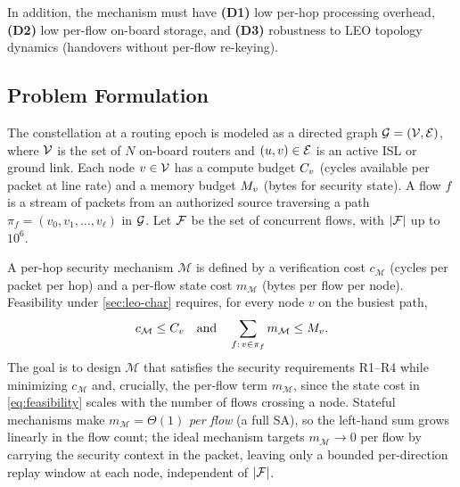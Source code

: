 In addition, the mechanism must have \textbf{(D1)} low per-hop processing
overhead, \textbf{(D2)} low per-flow on-board storage, and \textbf{(D3)}
robustness to LEO topology dynamics (handovers without per-flow re-keying).

\subsection{Problem Formulation}
\label{sec:formulation}

The constellation at a routing epoch is modeled as a directed graph
$\mathcal{G}=(\mathcal{V},\mathcal{E})$, where $\mathcal{V}$ is the set of $N$ on-board routers and
$(u,v)\in\mathcal{E}$ is an active ISL or ground link. Each node $v\in\mathcal{V}$ has a
compute budget $C_v$ (cycles available per packet at line rate) and a memory
budget $M_v$ (bytes for security state). A flow $f$ is a stream of packets from
an authorized source traversing a path $\pi_f=(v_0,v_1,\dots,v_\ell)$ in
$\mathcal{G}$. Let $\mathcal{F}$ be the set of concurrent flows, with $|\mathcal{F}|$ up to
$10^6$.

A per-hop security mechanism $\mathcal{M}$ is defined by a verification cost
$c_{\mathcal{M}}$ (cycles per packet per hop) and a per-flow state cost
$m_{\mathcal{M}}$ (bytes per flow per node). Feasibility under
\cref{sec:leo-char} requires, for every node $v$ on the busiest path,
\begin{equation}
\label{eq:feasibility}
c_{\mathcal{M}} \le C_v
\quad\text{and}\quad
\sum_{f:\,v\in\pi_f} m_{\mathcal{M}} \le M_v .
\end{equation}
The goal is to design $\mathcal{M}$ that satisfies the security requirements
R1--R4 while minimizing $c_{\mathcal{M}}$ and, crucially, the per-flow term
$m_{\mathcal{M}}$, since the state cost in \cref{eq:feasibility} scales with the
number of flows crossing a node. Stateful mechanisms make
$m_{\mathcal{M}}=\Theta(1)$ \emph{per flow} (a full SA), so the left-hand sum
grows linearly in the flow count; the ideal mechanism targets $m_{\mathcal{M}}\to 0$
per flow by carrying the security context in the packet, leaving only a bounded
per-direction replay window at each node, independent of $|\mathcal{F}|$.
